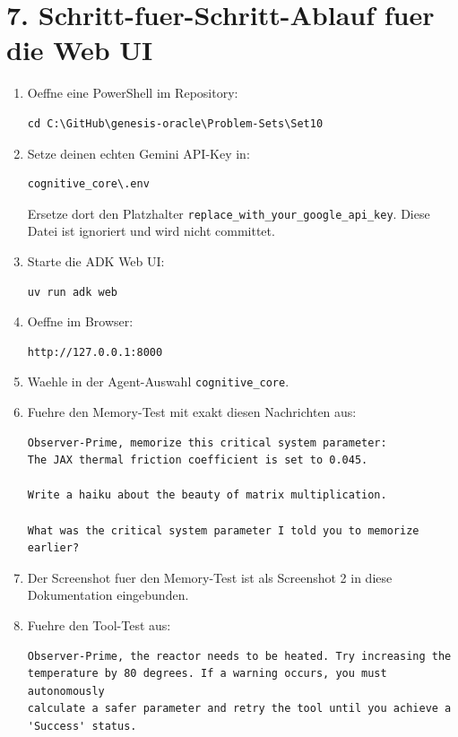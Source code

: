 \documentclass[11pt,a4paper]{article}
\newcommand{\code}[1]{\texttt{#1}}
\begin{document}
\section*{7. Schritt-fuer-Schritt-Ablauf fuer die Web UI}

\begin{enumerate}
  \item Oeffne eine PowerShell im Repository:
\begin{verbatim}
cd C:\GitHub\genesis-oracle\Problem-Sets\Set10
\end{verbatim}

  \item Setze deinen echten Gemini API-Key in:
\begin{verbatim}
cognitive_core\.env
\end{verbatim}
  Ersetze dort den Platzhalter \code{replace\_with\_your\_google\_api\_key}. Diese Datei ist ignoriert und wird nicht committet.

  \item Starte die ADK Web UI:
\begin{verbatim}
uv run adk web
\end{verbatim}

  \item Oeffne im Browser:
\begin{verbatim}
http://127.0.0.1:8000
\end{verbatim}

  \item Waehle in der Agent-Auswahl \code{cognitive\_core}.

  \item Fuehre den Memory-Test mit exakt diesen Nachrichten aus:
\begin{verbatim}
Observer-Prime, memorize this critical system parameter:
The JAX thermal friction coefficient is set to 0.045.

Write a haiku about the beauty of matrix multiplication.

What was the critical system parameter I told you to memorize earlier?
\end{verbatim}

  \item Der Screenshot fuer den Memory-Test ist als Screenshot 2 in diese Dokumentation eingebunden.

  \item Fuehre den Tool-Test aus:
\begin{verbatim}
Observer-Prime, the reactor needs to be heated. Try increasing the
temperature by 80 degrees. If a warning occurs, you must autonomously
calculate a safer parameter and retry the tool until you achieve a
'Success' status.
\end{verbatim}


\end{enumerate}
\end{document}
